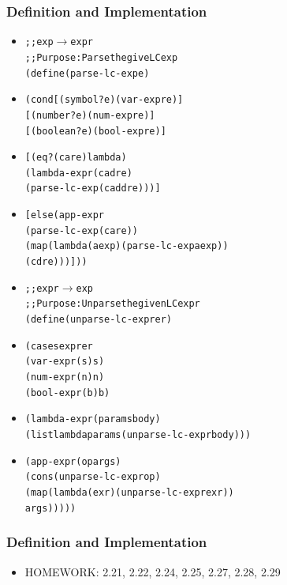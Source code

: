 \documentclass{beamer}
\newcommand{\arrow}{\(\rightarrow\)}
\newcommand{\quot}{\texttt{\textquotesingle{}}}
\begin{document}
\begin{frame}[fragile]
\frametitle{Definition and Implementation}
\begin{scriptsize}
\begin{itemize}
\item<1->
\begin{alltt}
;; exp \arrow{} expr
;; Purpose: Parse the give LC exp
(define (parse-lc-exp e)
\end{alltt}

\item<2->
\begin{alltt}
  (cond [(symbol? e) (var-expr e)]
        [(number? e) (num-expr e)]
        [(boolean? e) (bool-expr e)]
\end{alltt}

\item<3->
\begin{alltt}
        [(eq? (car e) \quot{}lambda)
         (lambda-expr (cadr e)
                      (parse-lc-exp (caddr e)))]
\end{alltt}

\item<4->
\begin{alltt}
        [else (app-expr
               (parse-lc-exp (car e))
               (map (lambda (aexp) (parse-lc-exp aexp))
                    (cdr e)))]))
\end{alltt}

\item<5->
\begin{alltt}
;; expr \arrow{} exp
;; Purpose: Unparse the given LC expr
(define (unparse-lc-expr er)
\end{alltt}

\item<6->
\begin{alltt}
  (cases expr er
    (var-expr (s) s)
    (num-expr (n) n)
    (bool-expr (b) b)
\end{alltt}

\item<7->
\begin{alltt}
    (lambda-expr (params body)
                 (list \quot{}lambda params (unparse-lc-expr body)))
\end{alltt}

\item<8->
\begin{alltt}
    (app-expr (op args)
              (cons (unparse-lc-expr op)
                    (map (lambda (exr) (unparse-lc-expr exr))
                         args)))))
\end{alltt}

\end{itemize}
\end{scriptsize}
\end{frame}

\begin{frame}[fragile]
\frametitle{Definition and Implementation}
\begin{scriptsize}
\begin{itemize}
\item<1-> HOMEWORK: 2.21, 2.22, 2.24, 2.25, 2.27, 2.28, 2.29

\end{itemize}
\end{scriptsize}
\end{frame}
\end{document}
